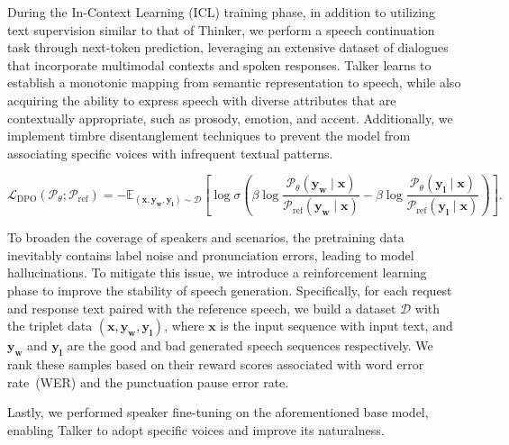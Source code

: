 During the In-Context Learning (ICL) training phase, in addition to utilizing text supervision similar to that of Thinker, we perform a speech continuation task through next-token prediction, leveraging an extensive dataset of dialogues that incorporate multimodal contexts and spoken responses. Talker learns to establish a monotonic mapping from semantic representation to speech, while also acquiring the ability to express speech with diverse attributes that are contextually appropriate, such as prosody, emotion, and accent. Additionally, we implement timbre disentanglement techniques to prevent the model from associating specific voices with infrequent textual patterns.

\begin{equation}
    \mathcal{L}_{\text{DPO}}(\mathcal{P}_\theta; \mathcal{P}_{\text{ref}}) = -\mathbb{E}_{(\bm{x}, \bm{y_w}, \bm{y_l}) \sim \mathcal{D}} \left[ \log \sigma \left( \beta \log \frac{\mathcal{P}_\theta(\bm{y_w} \mid \bm{x})}{\mathcal{P}_{\text{ref}}(\bm{y_w} \mid \bm{x})} - \beta \log \frac{\mathcal{P}_\theta(\bm{y_l} \mid \bm{x})}{\mathcal{P}_{\text{ref}}(\bm{y_l} \mid \bm{x})} \right) \right].
\end{equation}

To broaden the coverage of speakers and scenarios, the pretraining data inevitably contains label noise and pronunciation errors, leading to model hallucinations. 
To mitigate this issue, we introduce a reinforcement learning phase to improve the stability of speech generation.  Specifically, for each request and response text paired with the reference speech, we build a dataset $\mathcal{D}$ with the triplet data $(\bm{x}, \bm{y_w}, \bm{y_l})$, where $\bm{x}$ is the input sequence with input text, and $\bm{y_w}$ and $\bm{y_l}$ are the good and bad generated speech sequences respectively. We rank these samples based on their reward scores associated with word error rate~(WER) and the punctuation pause error rate.

Lastly, we performed speaker fine-tuning on the aforementioned base model, enabling Talker to adopt specific voices and improve its naturalness. %










